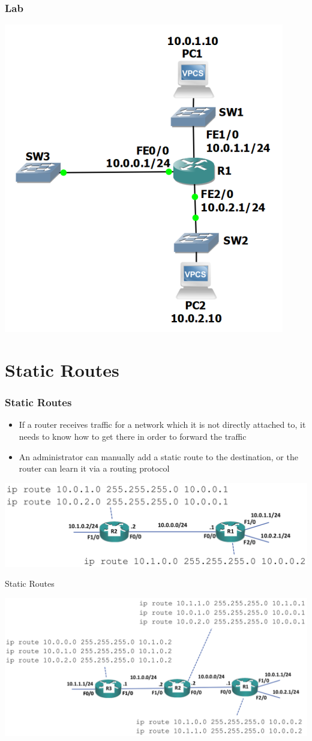 \documentclass[pdflatex,compress,mathserif]{beamer}
\begin{document}
\begin{frame}
	\frametitle{Lab}
	\begin{center}
		\includegraphics[width=0.5\linewidth]{img/img02}
	\end{center}
\end{frame}

\section{Static Routes}

\begin{frame}
	\frametitle{Static Routes}
	\begin{itemize}
		\item If a router receives traffic for a network which it is not directly attached to, it needs to know how to get there in order to forward the traffic
		\item An administrator can manually add a static route to the destination, or the router can learn it via a routing protocol
	\end{itemize}
	\begin{center}
		\includegraphics[width=\linewidth]{img/img03}
	\end{center}
\end{frame}

\begin{frame}{Static Routes}
	\begin{center}
		\includegraphics[width=\linewidth]{img/img04}
	\end{center}
\end{frame}
\end{document}
